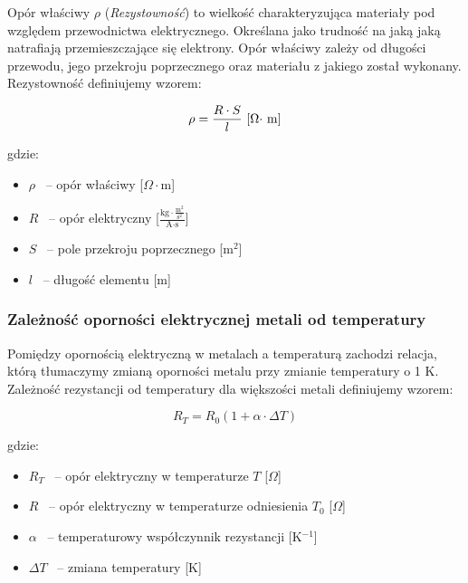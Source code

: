\documentclass[a4paper,12pts]{article}
\begin{document}
	Opór właściwy $\rho$ (\textit{Rezystowność}) to wielkość charakteryzująca materiały pod względem przewodnictwa elektrycznego. Określana jako trudność na jaką jaką natrafiają przemieszczające się elektrony. Opór właściwy zależy od długości przewodu, jego przekroju poprzecznego oraz materiału z jakiego został wykonany. Rezystowność definiujemy wzorem:
	
	\begin{equation}
		\rho = \frac{R \cdot S}{l} \textrm{  [$\Omega \cdot$ \textrm{m}]}
	\end{equation}

	gdzie: 
	\begin{itemize}
		\item $\rho$ ~-- opór właściwy [$\Omega \cdot \textrm{m}$]
		\item $R$ ~-- opór elektryczny [$\frac{\textrm{kg} \cdot \frac{\textrm{m}^{2}}{\textrm{s}^{2}}}{\textrm{A} \cdot \textrm{s}}$]
		\item $S$ ~-- pole przekroju poprzecznego [\textrm{m}$^{2}$]
		\item $l$ ~-- długość elementu [m]
	\end{itemize}


	\subsubsection{Zależność oporności elektrycznej metali od temperatury}
	
	Pomiędzy opornością elektryczną w metalach a temperaturą zachodzi relacja, którą tłumaczymy zmianą oporności metalu przy zmianie temperatury o 1 K. Zależność rezystancji od temperatury dla większości metali definiujemy wzorem:
	
	\begin{equation}
		R_{T} = R_{0}(1 + \alpha \cdot \Delta T)
	\end{equation}
	
	gdzie:
	\begin{itemize}
	\item $R_{T}$ ~-- opór elektryczny w temperaturze $T$ [$\Omega$]
	\item $R$ ~-- opór elektryczny w temperaturze odniesienia $T_{0}$ [$\Omega$]
	\item $\alpha$ ~-- temperaturowy współczynnik rezystancji [K$^{-1}$]
	\item $\Delta T$ ~-- zmiana temperatury [K]
\end{itemize}
	
\end{document}
